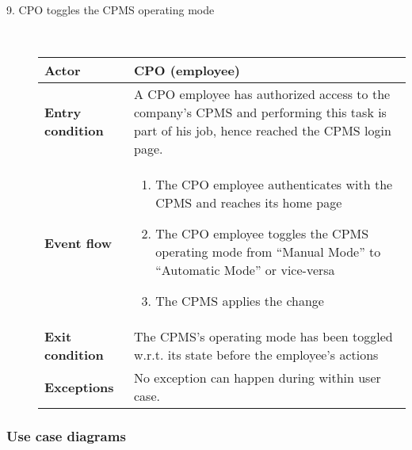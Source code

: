 \documentclass[11pt]{article}
\begin{document}
\begin{description}
    \item [9. CPO toggles the CPMS operating mode] \hfill \\
    \begin{table}[H]
        \centering
        \setlength{\tabcolsep}{18pt}
        \renewcommand{\arraystretch}{1.4}
        \begin{tabularx}{\textwidth}{|>{\hsize=0.5\hsize}X|>{\hsize=1.5\hsize}X|}
            \hline
            \textbf{Actor} & CPO (employee) \\
            \hline
            \textbf{Entry condition} & A CPO employee has authorized access to the company's CPMS and performing this task is part of his job, hence reached the CPMS login page. \\
            \hline
            \textbf{Event flow} & 
                \begin{minipage}[t]{\hsize}
                \begin{enumerate}[topsep=0pt, leftmargin=*]
                    \item The CPO employee authenticates with the CPMS and reaches its home page
                    \item The CPO employee toggles the CPMS operating mode from “Manual Mode” to “Automatic Mode” or vice-versa
                    \item The CPMS applies the change
                \end{enumerate}
                \end{minipage}
                \vspace{6pt}
            \\
            \hline
            \textbf{Exit condition} & The CPMS's operating mode has been toggled w.r.t. its state before the employee's actions \\
            \hline
            \textbf{Exceptions} & No exception can happen during within user case. \\
            \hline
        \end{tabularx}
    \end{table}
\end{description}

\subsubsection{Use case diagrams}
\end{document}
